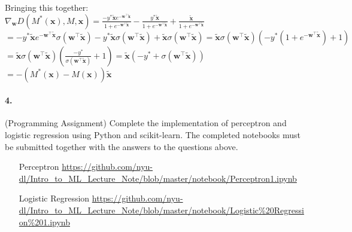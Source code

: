 \documentclass{article}
\newcommand{\vect}[1]{\mathbf{#1}}
\newcommand{\vx}[0]{\vect{x}}
\newcommand{\vw}[0]{\vect{w}}
\newcommand{\sigmoid}{\sigma}
\begin{document}
Bringing this together: \\
$ \nabla_{\vw} D(M^*(\vx), M, \vx) =  \frac {-y^* \tilde{\vx}e^{-\vw^\top \tilde{\vx}}}{1 + e^{-\vw^\top \tilde{\vx}}} - \frac{y^* \tilde{\vx}}{1 + e^{-\vw^\top \tilde{\vx}}} + \frac{\tilde{\vx}}{1 + e^{-\vw^\top \tilde{\vx}}} $ \\
$ = -y^* \tilde{\vx}e^{-\vw^\top \tilde{\vx}} \sigmoid(\vw^\top \tilde{\vx}) -y^* \tilde{\vx}\sigmoid(\vw^\top \tilde{\vx}) + \tilde{\vx}\sigmoid(\vw^\top \tilde{\vx}) = \tilde{\vx}\sigmoid(\vw^\top \tilde{\vx}) (-y^* (1 + e^{-\vw^\top \tilde{\vx}}) + 1)$ \\
$ = \tilde{\vx}\sigmoid(\vw^\top \tilde{\vx}) (\frac{-y^* }{\sigmoid(\vw^\top \tilde{\vx})} + 1) = \tilde{\vx} (-y^* + \sigmoid(\vw^\top \tilde{\vx}))$ \\
$ = -(M^*(\vx) - M(\vx)) \tilde{\vx}$


\vspace{5mm}



\paragraph{4.} (Programming Assignment)
Complete the implementation of perceptron and logistic regression using Python
and scikit-learn. The completed notebooks must be submitted together with the
answers to the questions above. 
\begin{itemize}
    \item[Perceptron]
        \url{https://github.com/nyu-dl/Intro_to_ML_Lecture_Note/blob/master/notebook/Perceptron1.ipynb}
    \item[Logistic Regression]
        \url{https://github.com/nyu-dl/Intro_to_ML_Lecture_Note/blob/master/notebook/Logistic%20Regression%201.ipynb}
\end{itemize}





%
%
\end{document}
